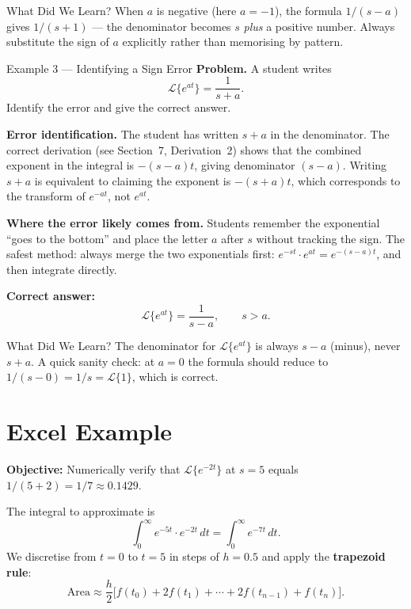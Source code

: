 \documentclass[12pt,a4paper]{article}
\begin{document}
\begin{learnbox}{What Did We Learn?}
When $a$ is negative (here $a = -1$), the formula $1/(s-a)$ gives
$1/(s+1)$ --- the denominator becomes $s$ \emph{plus} a positive number.
Always substitute the sign of $a$ explicitly rather than memorising by
pattern.
\end{learnbox}

\begin{infobox}{Example 3 --- Identifying a Sign Error}
\textbf{Problem.} A student writes
\[
  \mathcal{L}\{e^{at}\} = \frac{1}{s + a}.
\]
Identify the error and give the correct answer.

\medskip
\textbf{Error identification.} The student has written $s + a$ in the
denominator. The correct derivation (see Section~7, Derivation~2) shows that
the combined exponent in the integral is $-(s-a)t$, giving denominator
$(s - a)$. Writing $s + a$ is equivalent to claiming the exponent is
$-(s+a)t$, which corresponds to the transform of $e^{-at}$, not $e^{at}$.

\medskip
\textbf{Where the error likely comes from.} Students remember the exponential
``goes to the bottom'' and place the letter $a$ after $s$ without tracking the
sign. The safest method: always merge the two exponentials first:
$e^{-st} \cdot e^{at} = e^{-(s-a)t}$, and then integrate directly.

\medskip
\textbf{Correct answer:}
\[
  \mathcal{L}\{e^{at}\} = \frac{1}{s - a}, \qquad s > a.
\]
\end{infobox}

\begin{learnbox}{What Did We Learn?}
The denominator for $\mathcal{L}\{e^{at}\}$ is always $s - a$ (minus), never
$s + a$. A quick sanity check: at $a = 0$ the formula should reduce to
$1/(s-0) = 1/s = \mathcal{L}\{1\}$, which is correct.
\end{learnbox}

\section{Excel Example}

\textbf{Objective:} Numerically verify that $\mathcal{L}\{e^{-2t}\}$ at
$s = 5$ equals $1/(5+2) = 1/7 \approx 0.1429$.

\medskip
The integral to approximate is
\[
  \int_0^\infty e^{-5t} \cdot e^{-2t}\, dt = \int_0^\infty e^{-7t}\, dt.
\]
We discretise from $t = 0$ to $t = 5$ in steps of $h = 0.5$ and apply the
\textbf{trapezoid rule}:
\[
  \text{Area} \approx \frac{h}{2}\bigl[f(t_0) + 2f(t_1) + \cdots + 2f(t_{n-1}) + f(t_n)\bigr].
\]
\end{document}
